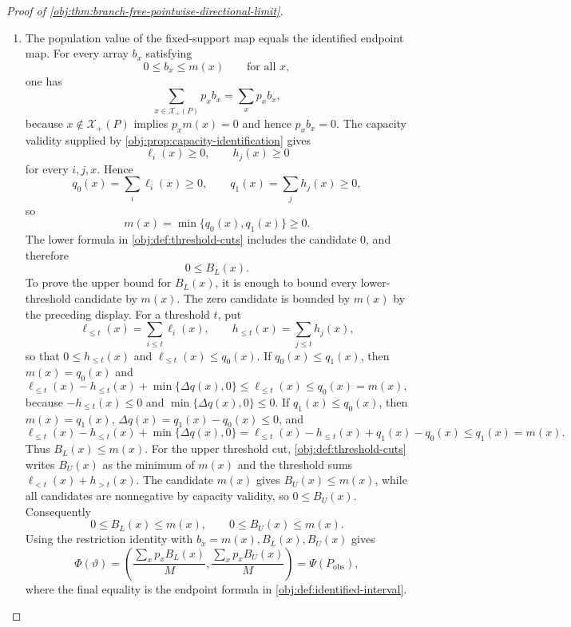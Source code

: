 \documentclass[11pt]{article}
\begin{document}
\begin{proof}[Proof of \cref{obj:thm:branch-free-pointwise-directional-limit}]
\begin{enumerate}
\item The population value of the fixed-support map equals the identified endpoint map. For every array \(b_x\) satisfying
\[
0\le b_x\le m(x)\qquad\text{for all }x,
\]
one has
\[
\sum_{x\in\mathcal X_+(P)}p_xb_x=\sum_xp_xb_x,
\]
because \(x\notin\mathcal X_+(P)\) implies \(p_xm(x)=0\) and hence \(p_xb_x=0\). The capacity validity supplied by \cref{obj:prop:capacity-identification} gives
\[
\ell_i(x)\ge0,\qquad h_j(x)\ge0
\]
for every \(i,j,x\). Hence
\[
q_0(x)=\sum_i\ell_i(x)\ge0,\qquad
q_1(x)=\sum_j h_j(x)\ge0,
\]
so
\[
m(x)=\min\{q_0(x),q_1(x)\}\ge0.
\]
The lower formula in \cref{obj:def:threshold-cuts} includes the candidate \(0\), and therefore
\[
0\le B_L(x).
\]
To prove the upper bound for \(B_L(x)\), it is enough to bound every lower-threshold candidate by \(m(x)\). The zero candidate is bounded by \(m(x)\) by the preceding display. For a threshold \(t\), put
\[
\ell_{\le t}(x)=\sum_{i\le t}\ell_i(x),\qquad
h_{\le t}(x)=\sum_{j\le t}h_j(x),
\]
so that \(0\le h_{\le t}(x)\) and \(\ell_{\le t}(x)\le q_0(x)\). If \(q_0(x)\le q_1(x)\), then \(m(x)=q_0(x)\) and
\[
\ell_{\le t}(x)-h_{\le t}(x)+\min\{\Delta q(x),0\}
\le
\ell_{\le t}(x)
\le q_0(x)=m(x),
\]
because \(-h_{\le t}(x)\le0\) and \(\min\{\Delta q(x),0\}\le0\). If \(q_1(x)\le q_0(x)\), then \(m(x)=q_1(x)\), \(\Delta q(x)=q_1(x)-q_0(x)\le0\), and
\[
\ell_{\le t}(x)-h_{\le t}(x)+\min\{\Delta q(x),0\}
=
\ell_{\le t}(x)-h_{\le t}(x)+q_1(x)-q_0(x)
\le q_1(x)=m(x).
\]
Thus \(B_L(x)\le m(x)\). For the upper threshold cut, \cref{obj:def:threshold-cuts} writes \(B_U(x)\) as the minimum of \(m(x)\) and the threshold sums \(\ell_{<t}(x)+h_{>t}(x)\). The candidate \(m(x)\) gives \(B_U(x)\le m(x)\), while all candidates are nonnegative by capacity validity, so \(0\le B_U(x)\). Consequently
\[
0\le B_L(x)\le m(x),\qquad 0\le B_U(x)\le m(x).
\]
Using the restriction identity with \(b_x=m(x),B_L(x),B_U(x)\) gives
\[
\Phi(\vartheta)
=
\left(
\frac{\sum_xp_xB_L(x)}{M},
\frac{\sum_xp_xB_U(x)}{M}
\right)
=
\Psi(P_{\mathrm{obs}}),
\]
where the final equality is the endpoint formula in \cref{obj:def:identified-interval}. %


\end{enumerate}
\end{proof}
\end{document}
